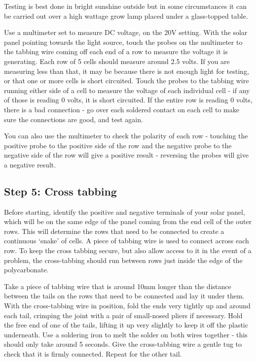 \documentclass{article}
\theoremstyle{definition}
\theoremstyle{definition}
\theoremstyle{remark}
\begin{document}
    Testing is best done in bright sunshine outside but in some circumstances it can be carried out over a high wattage grow lamp placed under a glass-topped table. 

    Use a multimeter set to measure DC voltage, on the 20V setting. With the solar panel pointing towards the light source, touch the probes on the multimeter to the tabbing wire coming off each end of a row to measure the voltage it is generating. Each row of 5 cells should measure around 2.5 volts. If you are measuring less than that, it may be because there is not enough light for testing, or that one or more cells is short circuited. Touch the probes to the tabbing wire running either side of a cell to measure the voltage of each individual cell - if any of those is reading 0 volts, it is short circuited. If the entire row is reading 0 volts, there is a bad connection - go over each soldered contact on each cell to make sure the connections are good, and test again.

    You can also use the multimeter to check the polarity of each row - touching the positive probe to the positive side of the row and the negative probe to the negative side of the row will give a positive result - reversing the probes will give a negative result.
  

  \subsection{Step 5: Cross tabbing} %
  \label{sub:step_5_cross_tabbing}

    Before starting, identify the positive and negative terminals of your solar panel, which will be on the same edge of the panel coming from the end cell of the outer rows. This will determine the rows that need to be connected to create a continuous ‘snake’ of cells. A piece of tabbing wire is used to connect across each row. To keep the cross tabbing secure, but also allow access to it in the event of a problem, the cross-tabbing should run between rows just inside the edge of the polycarbonate. 

    Take a piece of tabbing wire that is around 10mm longer than the distance between the tails on the rows that need to be connected and lay it under them. With the cross-tabbing wire in position, fold the ends very tightly up and around each tail, crimping the joint with a pair of small-nosed pliers if necessary. Hold the free end of one of the tails, lifting it up very slightly to keep it off the plastic underneath. Use a soldering iron to melt the solder on both wires together - this should only take around 5 seconds. Give the cross-tabbing wire a gentle tug to check that it is firmly connected. Repeat for the other tail. 
\end{document}
